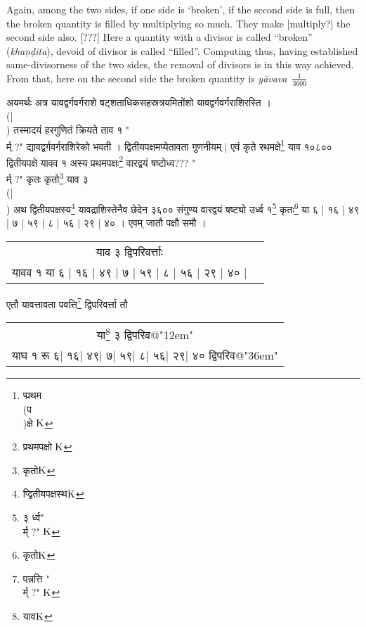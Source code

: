 \documentclass[11pt,a5paper]{book}
\def\yavava{\textit{y\=avava}}
\begin{document}
Again, among the two sides, if one side is `broken', if the second side is full, then the broken quantity is filled by multiplying so much. They make [multiply?] the second side also. [???] Here a quantity with a divisor is called
“broken” (\textit{kha\d n\d dita}), devoid of divisor is called “filled”. Computing thus, having established same-divisorness of the two sides, the removal of divisors is in this way achieved. From that, here on the second side  
the broken quantity is \yavava\ $\frac{1}{3600}$

\newpage 
{\s अयमर्थः %
अत्र यावद्वर्गवर्गराशे षट्शताधिकसहस्रत्रयमितोंशो
यावद्वर्गवर्गराशिरस्ति । \\(|\\)
तस्मादयं हरगुणितं क्रियते ताव १ "{\\र्म् ?}" द्यावद्वर्गवर्गराशिरेको
भवती । %
द्वितीयपक्षमप्येतावता गुणनीयम् | 
एवं कृते
रथमक्षे\footnote{{\s प्प्रथम\\(प\\)क्षे }${\rm K}$}
याव १०८०० द्वितीयपक्षे यावव १ अस्य प्रथमपक्षः\footnote{{\s प्रथमपक्षो }${\rm K}$}
वारद्वयं षष्टोध्व???  "{\\र्म् ?}" कृतः कृतो\footnote{{\s कृतो}${\rm K}$} याव ३\\(|\\)
अथ द्वितीयपक्षस्य\footnote{{\s प्द्वितीयपक्षस्थ}${\rm K}$} यावद्राशिस्तेनैव छेदेन ३६००
संगुण्य वारद्वयं षष्ट्यो उर्ध्व १\footnote{{\s ३ र्ध्व"\\र्म् ?" }${\rm K}$} कृतः\footnote{{\s कृतो}${\rm K}$}
या ६ | १६ | ४९ | ७ | ५९ | ८ | ५६ | २९ | ४० । 
एवम् जातौ पक्षौ समौ ।
\begin{tabular}{c | c }
{\s याव ३ द्विपरिवर्त्ताः }						\\ 
{\s यावव १ या ६ | १६ | ४९ | ७ | ५९ | ८ | ५६ | २९ | ४० |}	\\ 
\end{tabular}
एतौ यावत्तावता पवत्ति\footnote{{\s पन्नत्ति "{\\र्म् ?}" }${\rm K}$} द्विपरिवर्त्ता तौ
\begin{tabular}{c}
{\s या\footnote{{\s याव}${\rm K}$} ३ द्विपरिव@}"{{12em}"}				\\ 
{\s याघ १ रू ६| १६| ४९| ७| ५९| ८| ५६| २९| ४० द्विपरिव@}"{{36em}"} 	\\ 
\end{tabular} 
}
\end{document}
